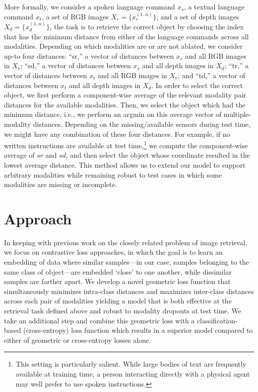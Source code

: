 \documentclass[10pt]{article} %
\begin{document}
More formally, we consider a spoken language command $x_s$, a textual language command $x_t$, a set of RGB images $X_r = \{x_r^{(1..n)}\}$, and a set of depth images $X_d = \{x_d^{(1..n)}\}$, the task is to retrieve the correct object by choosing the index that has the minimum distance from either of the language commands across all modalities.
Depending on which modalities are or are not ablated, we consider up-to four distances: ``sr,'' a vector of distances between $x_s$ and all RGB images in $X_r$; ``sd,'' a vector of distances between $x_s$ and all depth images in $X_d$; ``tr,'' a vector of distances between $x_t$ and all RGB images in $X_r$; and ``td,'' a vector of distances between $x_t$ and all depth images in $X_d$. In order to select the correct object, we first perform a component-wise average of the relevant modality pair distances for the available modalities. Then, we select the object which had the minimum distance, i.e., we perform an argmin on this average vector of multiple-modality distances. Depending on the missing/available sensors during test time, we might have any combination of these four distances. For example, if no written instructions are available at test time,\footnote{This setting is particularly salient. While large bodies of text are frequently available at training time, a person interacting directly with a physical agent may well prefer to use spoken instructions.} we compute the component-wise average of $sr$ and $sd$, and then select the object whose coordinate resulted in the lowest average distance. This method allows us to extend our model to support arbitrary modalities while remaining robust to test cases in which some modalities are missing or incomplete. 



\section{Approach}
\label{sec:Method}

In keeping with previous work on the closely related problem of image retrieval, we focus on contrastive loss approaches, in which the goal is to learn an embedding of data where similar samples---in our case, samples belonging to the same class of object---are embedded `close' to one another, while dissimilar samples are farther apart. We develop a novel geometric loss function that simultaneously minimizes intra-class distances and maximizes inter-class distances across each pair of modalities yielding a model that is both effective at the retrieval task defined above and robust to modality dropouts at test time. We take an additional step and combine this geometric loss with a classification-based (cross-entropy) loss function which results in a superior model compared to either of geometric or cross-entropy losses alone.
\end{document}

